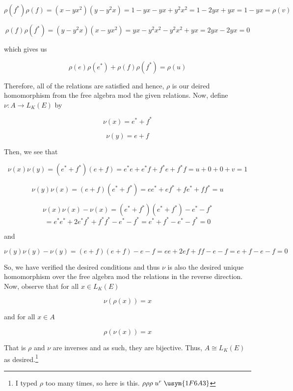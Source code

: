 \begin{solution}
    $$\rho(f^*)\rho(f)=(x-yx^2)(y-y^2x)=1-yx-yx+y^2x^2=1-2yx+yx=1-yx=\rho(v)$$

    $$\rho(f)\rho(f^*)=(y-y^2x)(x-yx^2)=yx-y^2x^2-y^2x^2+yx=2yx-2yx=0$$
    
    which gives us

    $$\rho(e)\rho(e^*)+\rho(f)\rho(f^*)=\rho(u)$$

    Therefore, all of the relations are satisfied and hence, $\rho$ is our deired homomorphism from the
    free algebra mod the given relations. Now, define $\nu:A\to L_K(E)$ by

    $$\nu(x)=e^*+f^*$$

    $$\nu(y)=e+f$$

    Then, we see that

    $$\nu(x)\nu(y)=(e^*+f^*)(e+f)=e^*e+e^*f+f^*e+f^*f=u+0+0+v=1$$

    $$\nu(y)\nu(x)=(e+f)(e^*+f^*)=ee^*+ef^*+fe^*+ff^*=u$$

    $$\nu(x)\nu(x)-\nu(x)=(e^*+f^*)(e^*+f^*)-e^*-f^*$$
    $$=e^*e^*+2e^*f^*+f^*f^*-e^*-f^*=e^*+f^*-e^*-f^*=0$$

    and

    $$\nu(y)\nu(y)-\nu(y)=(e+f)(e+f)-e-f=ee+2ef+ff-e-f=e+f-e-f=0$$

    So, we have verified the desired conditions and thus $\nu$ is also the desired unique homomorphism
    over the free algebra mod the relations in the reverse direction. Now, observe that
    for all $x\in L_K(E)$

    $$\nu(\rho(x))=x$$

    and for all $x\in A$

    $$\rho(\nu(x))=x$$

    That is $\rho$ and $\nu$ are inverses and as such, they are bijective. Thus, $A\cong L_K(E)$ as
    desired.\footnote{I typed $\rho$ too many times, so here is this. $\rho\rho\rho\;u^r\;\usym{1F6A3}$}

\end{solution}